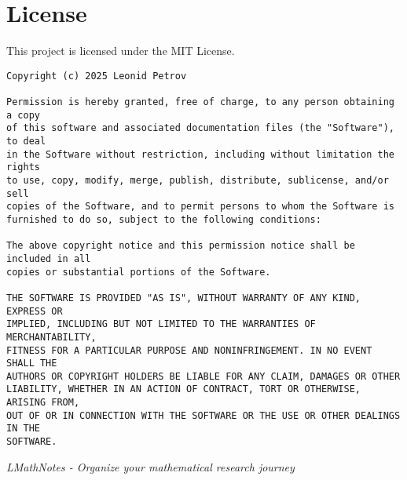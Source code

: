 \documentclass{article}
\begin{document}
\section{License}

This project is licensed under the MIT License.

\begin{verbatim}
Copyright (c) 2025 Leonid Petrov

Permission is hereby granted, free of charge, to any person obtaining a copy
of this software and associated documentation files (the "Software"), to deal
in the Software without restriction, including without limitation the rights
to use, copy, modify, merge, publish, distribute, sublicense, and/or sell
copies of the Software, and to permit persons to whom the Software is
furnished to do so, subject to the following conditions:

The above copyright notice and this permission notice shall be included in all
copies or substantial portions of the Software.

THE SOFTWARE IS PROVIDED "AS IS", WITHOUT WARRANTY OF ANY KIND, EXPRESS OR
IMPLIED, INCLUDING BUT NOT LIMITED TO THE WARRANTIES OF MERCHANTABILITY,
FITNESS FOR A PARTICULAR PURPOSE AND NONINFRINGEMENT. IN NO EVENT SHALL THE
AUTHORS OR COPYRIGHT HOLDERS BE LIABLE FOR ANY CLAIM, DAMAGES OR OTHER
LIABILITY, WHETHER IN AN ACTION OF CONTRACT, TORT OR OTHERWISE, ARISING FROM,
OUT OF OR IN CONNECTION WITH THE SOFTWARE OR THE USE OR OTHER DEALINGS IN THE
SOFTWARE.
\end{verbatim}

\vspace{1cm}
\hrulefill

\begin{center}
\textit{LMathNotes - Organize your mathematical research journey}
\end{center}
\end{document}

